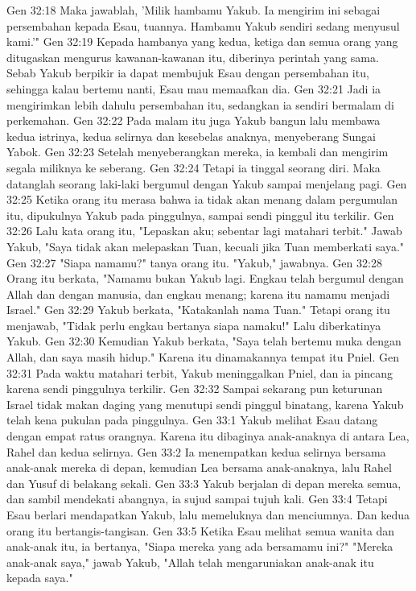 Gen 32:18  Maka jawablah, 'Milik hambamu Yakub. Ia mengirim ini sebagai persembahan kepada Esau, tuannya. Hambamu Yakub sendiri sedang menyusul kami.'"
Gen 32:19  Kepada hambanya yang kedua, ketiga dan semua orang yang ditugaskan mengurus kawanan-kawanan itu, diberinya perintah yang sama. Sebab Yakub berpikir ia dapat membujuk Esau dengan persembahan itu, sehingga kalau bertemu nanti, Esau mau memaafkan dia.
Gen 32:21  Jadi ia mengirimkan lebih dahulu persembahan itu, sedangkan ia sendiri bermalam di perkemahan.
Gen 32:22  Pada malam itu juga Yakub bangun lalu membawa kedua istrinya, kedua selirnya dan kesebelas anaknya, menyeberang Sungai Yabok.
Gen 32:23  Setelah menyeberangkan mereka, ia kembali dan mengirim segala miliknya ke seberang.
Gen 32:24  Tetapi ia tinggal seorang diri. Maka datanglah seorang laki-laki bergumul dengan Yakub sampai menjelang pagi.
Gen 32:25  Ketika orang itu merasa bahwa ia tidak akan menang dalam pergumulan itu, dipukulnya Yakub pada pinggulnya, sampai sendi pinggul itu terkilir.
Gen 32:26  Lalu kata orang itu, "Lepaskan aku; sebentar lagi matahari terbit." Jawab Yakub, "Saya tidak akan melepaskan Tuan, kecuali jika Tuan memberkati saya."
Gen 32:27  "Siapa namamu?" tanya orang itu. "Yakub," jawabnya.
Gen 32:28  Orang itu berkata, "Namamu bukan Yakub lagi. Engkau telah bergumul dengan Allah dan dengan manusia, dan engkau menang; karena itu namamu menjadi Israel."
Gen 32:29  Yakub berkata, "Katakanlah nama Tuan." Tetapi orang itu menjawab, "Tidak perlu engkau bertanya siapa namaku!" Lalu diberkatinya Yakub.
Gen 32:30  Kemudian Yakub berkata, "Saya telah bertemu muka dengan Allah, dan saya masih hidup." Karena itu dinamakannya tempat itu Pniel.
Gen 32:31  Pada waktu matahari terbit, Yakub meninggalkan Pniel, dan ia pincang karena sendi pinggulnya terkilir.
Gen 32:32  Sampai sekarang pun keturunan Israel tidak makan daging yang menutupi sendi pinggul binatang, karena Yakub telah kena pukulan pada pinggulnya.
Gen 33:1  Yakub melihat Esau datang dengan empat ratus orangnya. Karena itu dibaginya anak-anaknya di antara Lea, Rahel dan kedua selirnya.
Gen 33:2  Ia menempatkan kedua selirnya bersama anak-anak mereka di depan, kemudian Lea bersama anak-anaknya, lalu Rahel dan Yusuf di belakang sekali.
Gen 33:3  Yakub berjalan di depan mereka semua, dan sambil mendekati abangnya, ia sujud sampai tujuh kali.
Gen 33:4  Tetapi Esau berlari mendapatkan Yakub, lalu memeluknya dan menciumnya. Dan kedua orang itu bertangis-tangisan.
Gen 33:5  Ketika Esau melihat semua wanita dan anak-anak itu, ia bertanya, "Siapa mereka yang ada bersamamu ini?" "Mereka anak-anak saya," jawab Yakub, "Allah telah mengaruniakan anak-anak itu kepada saya."
